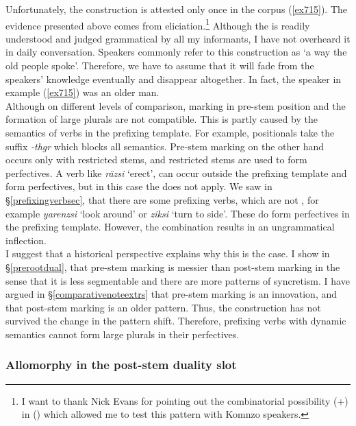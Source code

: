 Unfortunately, the  construction is attested only once in the corpus (\ref{ex715}). The evidence presented above comes from eliciation.\footnote{I want to thank Nick Evans for pointing out the combinatorial possibility (\Sg+\Du) in  (\citealt{Evans:2014bz}) which allowed me to test this pattern with Komnzo speakers.} Although the  is readily understood and judged grammatical by all my informants, I have not overheard it in daily conversation. Speakers commonly refer to this construction as `a way the old people spoke'. Therefore, we have to assume that it will fade from the speakers'  knowledge eventually and disappear altogether. In fact, the speaker in example (\ref{ex715}) was an older man.\\

Although on different levels of comparison,  marking in pre-stem position and the formation of large plurals are not compatible. This is partly caused by the  semantics of verbs in the prefixing template. For example, positionals take the  suffix \emph{-thgr} which blocks all  semantics. Pre-stem  marking on the other hand occurs only with restricted stems, and restricted stems are used to form perfectives. A  verb like \emph{räzsi} `erect', can occur outside the prefixing template and form perfectives, but in this case the  does not apply. We saw in \S{}\ref{prefixingverbsec}, that there are some prefixing verbs, which are not , for example \emph{yarenzsi} `look around' or \emph{ziksi} `turn to side'. These do form perfectives in the prefixing template. However, the  combination results in an ungrammatical inflection.\\

I suggest that a historical perspective explains why this is the case. I show in \S{}\ref{prerootdual}, that pre-stem  marking is messier than post-stem  marking in the sense that it is less segmentable and there are more patterns of syncretism. I have argued in \S{}\ref{comparativenoteextrs} that pre-stem  marking is an innovation, and that post-stem  marking is an older pattern. Thus, the  construction has not survived the change in the pattern shift. Therefore, prefixing verbs with dynamic semantics cannot form large plurals in their perfectives.

\subsubsection{Allomorphy in the post-stem duality slot} \label{allomorphdualsuffix}

